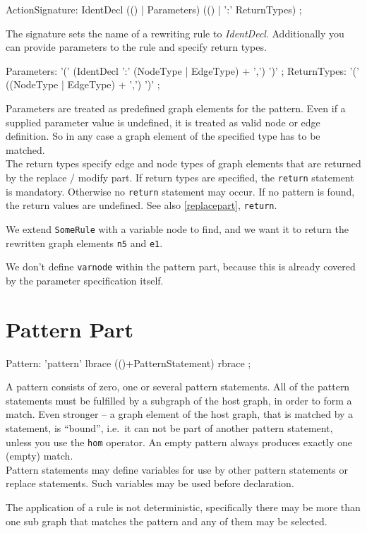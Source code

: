 \begin{rail}  
  ActionSignature: IdentDecl (() | Parameters) (() | ':' ReturnTypes) ;
\end{rail}
The signature sets the name of a rewriting rule to \emph{IdentDecl}. Additionally you can provide parameters to the rule and specify return types.

\begin{rail}
  Parameters: '(' (IdentDecl ':' (NodeType | EdgeType) + ',') ')' ;
  ReturnTypes: '(' ((NodeType | EdgeType) + ',') ')' ;
\end{rail}
Parameters are treated as predefined graph elements for the pattern. Even if a supplied parameter value is undefined, it is treated as valid node or edge definition. So in any case a graph element of the specified type has to be matched. \\
The return types specify edge and node types of graph elements that are returned by the replace / modify part. If return types are specified, the \texttt{return} statement is mandatory. Otherwise no \texttt{return} statement may occur. If no pattern is found, the return values are undefined. See also \ref{replacepart}, \texttt{return}.
\begin{example}
We extend \texttt{SomeRule} with a variable node to find, and we want it to return the rewritten graph elements \texttt{n5} and \texttt{e1}.
\begin{grgen}
  rule SomeRuleExt(varnode: Node): (Node, EdgeTypeB) {
    pattern{
      n1: NodeTypeA;
      ...
    }
    replace {
      varnode;
      ...  
      return(n5, e1);
      eval {
        ...
\end{grgen}
We don't define \texttt{varnode} within the pattern part, because this is already covered by the parameter specification itself.
\end{example}

\section{Pattern Part}
\label{patternpart}
\begin{rail}
  Pattern: 'pattern' lbrace (()+PatternStatement) rbrace ;
\end{rail}
A pattern consists of zero, one or several pattern statements. All of the pattern statements must be fulfilled by a subgraph of the host graph, in order to form a match. Even stronger -- a graph element of the host graph, that is matched by a statement, is ``bound'', i.e.\ it can not be part of another pattern statement, unless you use the \texttt{hom} operator. An empty pattern always produces exactly one (empty) match.\\
Pattern statements may define variables for use by other pattern statements or replace statements. Such variables may be used before declaration.
\begin{note}
The application of a rule is not deterministic, specifically there may be more than one sub graph that matches the pattern and any of them may be selected.
\end{note}

